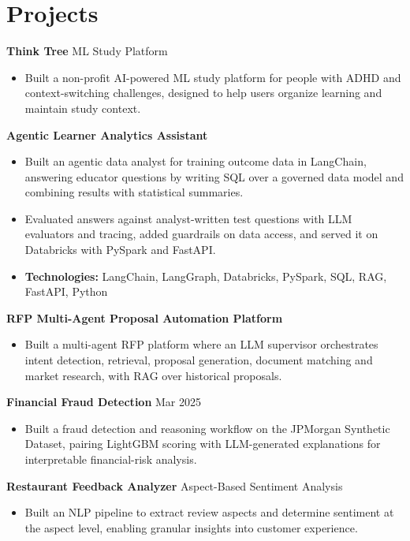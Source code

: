 \documentclass[10pt,a4paper]{article}
\begin{document}
\section{Projects}
\textbf{Think Tree} \textbar{} ML Study Platform\par
\begin{itemize}
  \item Built a non-profit AI-powered ML study platform for people with ADHD and context-switching challenges, designed to help users organize learning and maintain study context.
\end{itemize}
\textbf{Agentic Learner Analytics Assistant}\par
\begin{itemize}
  \item Built an agentic data analyst for training outcome data in LangChain, answering educator questions by writing SQL over a governed data model and combining results with statistical summaries.
  \item Evaluated answers against analyst-written test questions with LLM evaluators and tracing, added guardrails on data access, and served it on Databricks with PySpark and FastAPI.
  \item \textbf{Technologies:} LangChain, LangGraph, Databricks, PySpark, SQL, RAG, FastAPI, Python
\end{itemize}
\textbf{RFP Multi-Agent Proposal Automation Platform}\par
\begin{itemize}
  \item Built a multi-agent RFP platform where an LLM supervisor orchestrates intent detection, retrieval, proposal generation, document matching and market research, with RAG over historical proposals.
\end{itemize}
\textbf{Financial Fraud Detection} \textbar{} Mar 2025\par
\begin{itemize}
  \item Built a fraud detection and reasoning workflow on the JPMorgan Synthetic Dataset, pairing LightGBM scoring with LLM-generated explanations for interpretable financial-risk analysis.
\end{itemize}
\textbf{Restaurant Feedback Analyzer} \textbar{} Aspect-Based Sentiment Analysis\par
\begin{itemize}
  \item Built an NLP pipeline to extract review aspects and determine sentiment at the aspect level, enabling granular insights into customer experience.
\end{itemize}
\end{document}
